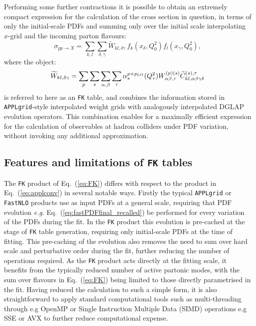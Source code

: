 \documentclass[preprint,12pt]{elsarticle}
\begin{document}
Performing some further contractions it is possible to obtain an
extremely compact expression for the calculation of the cross section
in question, in terms of only the initial-scale PDFs and summing only
over the initial scale interpolating $x$-grid and the incoming parton
flavours:
\begin{equation}\label{eq:FK}
  \sigma _{pp\to X} = \sum_{k,l}\sum_{\delta,\gamma} 
  \widetilde{W}_{kl,\delta\gamma} \,f_k(x_\delta,Q^2_0) f_l(x_\gamma,Q^2_0),
\end{equation}
where the object:
\begin{equation}\label{eq:FKTable}
  \widetilde{W}_{kl,\delta\gamma} = \sum_p\sum_{s}\sum_{\alpha,\beta} \sum_{\tau}
\alpha_s^{p+p_{\rm LO}}(Q^2_\tau)  W_{\alpha\beta,\tau}^{(p)(s)} \widetilde{C}^{(s),\tau}_{kl,\alpha\beta\gamma\delta}
\end{equation}
is referred to here as an {\tt FK} table, and combines the information
stored in {\tt APPLgrid}-style interpolated weight grids with
analogously interpolated DGLAP evolution operators. This combination
enables for a maximally efficient expression for the
calculation of observables at hadron colliders under PDF variation, without invoking
any additional approximation. 

\subsection{Features and limitations of {\tt FK} tables}

The {\tt FK} product of Eq.~(\ref{eq:FK}) differs with respect to the
product in Eq.~(\ref{eq:applconv}) in several notable ways. Firstly
the typical {\tt APPLgrid} or {\tt FastNLO} products use as input PDFs at a
general scale, requiring that PDF evolution {\it e.g.}
Eq.~(\ref{eq:fastPDFfinal_recalled}) be performed for every variation of the PDFs
during the fit. In the {\tt FK} product
this evolution is pre-cached at the stage of {\tt FK} table
generation, requiring only initial-scale PDFs at the time of fitting. 
This pre-caching of the evolution also removes the need to
 sum over hard scale and perturbative order during the
fit, further reducing the number of operations required. As the {\tt FK}
product acts directly at the fitting scale, it benefits from the typically reduced number of active
partonic modes, with the sum over flavours in
Eq.~(\ref{eq:FK}) being limited to those directly parametrised in the
fit. Having reduced the calculation to such a simple form, it is also
straightforward to apply standard 
computational tools such as multi-threading through e.g OpenMP or
Single Instruction Multiple Data (SIMD) operations e.g SSE or AVX to
further reduce computational expense. 
\end{document}
